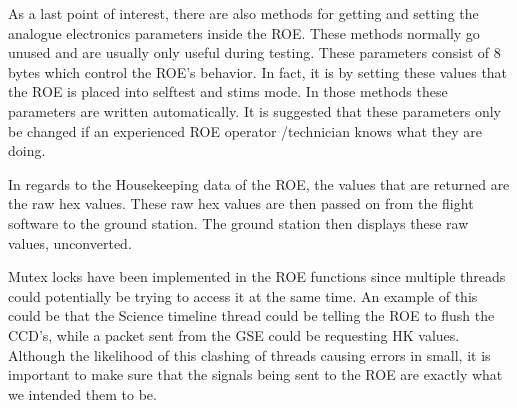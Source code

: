 As a last point of interest, there are also methods for getting and setting the analogue electronics parameters inside the ROE. These methods normally go unused and
are usually only useful during testing. These parameters consist of 8 bytes which control
the ROE’s behavior. In fact, it is by setting these values that the ROE is placed into
selftest and stims mode. In those methods these parameters are written automatically.
It is suggested that these parameters only be changed if an experienced ROE operator
/technician knows what they are doing.


In regards to the Housekeeping data of the ROE, the values that are returned are the raw hex values. These raw hex values are then passed on from the flight software to the ground station. The ground station then displays these raw values, unconverted.

Mutex locks have been implemented in the ROE functions since multiple threads could potentially be trying to access it at the same time. An example of this could be that the Science timeline thread could be telling the ROE to flush the CCD’s, while a packet sent from the GSE could be requesting HK values. Although the likelihood of this clashing of threads causing errors in small, it is important to make sure that the signals being sent to the ROE are exactly what we intended them to be.




